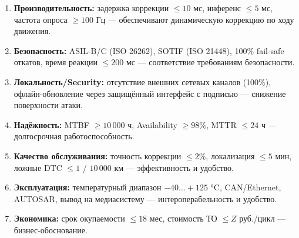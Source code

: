 \documentclass[14pt, a4paper]{extarticle}
\begin{document}
				\begin{enumerate}
					\item \textbf{Производительность:} задержка коррекции \(\leq 10\) мс, инференс \(\leq 5\) мс, частота опроса \(\geq 100\) Гц — обеспечивают динамическую коррекцию по ходу движения.
					\item \textbf{Безопасность:} ASIL-B/C (ISO 26262), SOTIF (ISO 21448), 100\% fail-safe откатов, время реакции \(\leq 200\) мс — соответствие требованиям безопасности.
					\item \textbf{Локальность/Security:} отсутствие внешних сетевых каналов (100\%), офлайн-обновление через защищённый интерфейс с подписью — снижение поверхности атаки.
					\item \textbf{Надёжность:} MTBF \(\geq 10\,000\) ч, Availability \(\geq 98\%\), MTTR \(\leq 24\) ч — долгосрочная работоспособность.
					\item \textbf{Качество обслуживания:} точность коррекции \(\leq 2\%\), локализация \(\leq 5\) мин, ложные DTC \(\leq 1\) / \(10\,000\) км — эффективность и удобство.
					\item \textbf{Эксплуатация:} температурный диапазон \(-40\ldots+125\) °C, CAN/Ethernet, AUTOSAR, вывод на медиасистему — интероперабельность и удобство.
					\item \textbf{Экономика:} срок окупаемости \(\leq 18\) мес, стоимость ТО \(\leq Z\) руб./цикл — бизнес-обоснование.
				\end{enumerate}	
					
\end{document}
